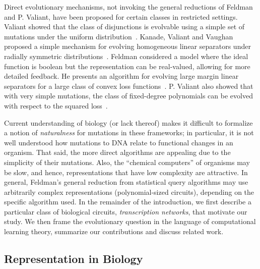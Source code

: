 Direct evolutionary mechanisms, not invoking the general reductions of Feldman
and P. Valiant, have been proposed for certain classes in restricted settings.
Valiant showed that the class of disjunctions is evolvable using a simple set of
mutations under the uniform distribution~\cite{Valiant:2009-evolvability}.
Kanade, Valiant and Vaughan proposed a simple mechanism for evolving homogeneous
linear separators under radially symmetric distributions~\cite{KVV:2010-drift}.
Feldman considered a model where the ideal function is boolean but the
representation can be real-valued, allowing for more detailed feedback. He
presents an algorithm for evolving large margin linear separators for a large
class of convex loss functions~\cite{Feldman:2011-LTF}. P. Valiant also showed
that with very simple mutations, the class of fixed-degree polynomials can be
evolved with respect to the squared loss~\cite{Valiant:2012-real}.

Current understanding of biology (or lack thereof) makes it
difficult to formalize a notion of \emph{naturalness} for mutations in these
frameworks; in particular, it is not well understood how mutations to DNA
relate to functional changes in an organism. That said, the more direct
algorithms are appealing due to the simplicity of their mutations.  Also, the
``chemical computers'' of organisms may be slow, and hence, representations that
have low complexity are attractive.  In general, Feldman's
general reduction from statistical query algorithms may use arbitrarily complex
representations (polynomial-sized circuits), depending on the specific algorithm
used.  In the remainder of the introduction, we first describe a particular
class of biological circuits, \emph{transcription networks}, that motivate our
study.  We then frame the evolutionary question in the language of computational
learning theory, summarize our contributions and discuss related work.

\subsection{Representation in Biology}

